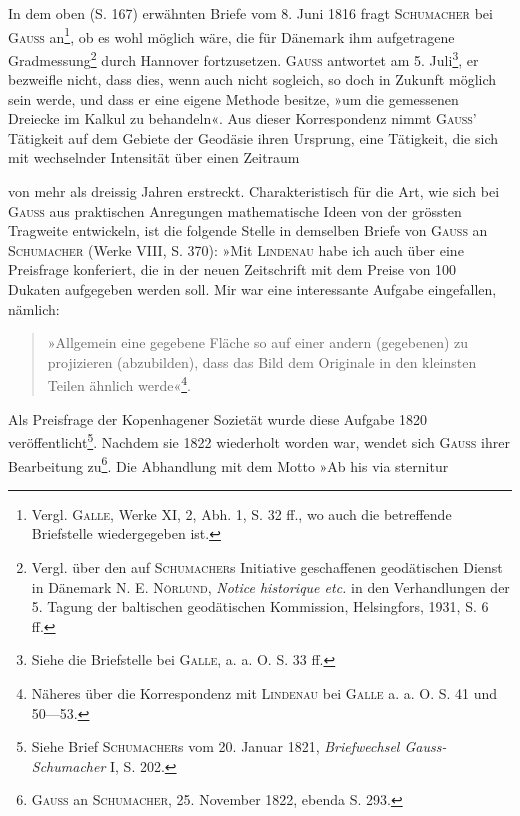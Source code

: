 \begin{center}\end{center}
\noindent\hspace*{\parindent}In dem oben (S. 167) erwähnten Briefe vom 8. Juni 1816 fragt \textsc{Schumacher}
bei \textsc{Gauss} an\footnote{Vergl. \textsc{Galle}, Werke XI, 2, Abh. 1, S. 32 ff., wo auch die betreffende Briefstelle wiedergegeben ist.}, ob es wohl möglich wäre, die für Dänemark ihm
aufgetragene Gradmessung\footnote{Vergl. über den auf \textsc{Schumacher}s Initiative geschaffenen geodätischen Dienst in Dänemark \textsc{N. E. Nörlund}, \textit{Notice historique etc.} in den Verhandlungen der 5. Tagung der baltischen geodätischen Kommission, Helsingfors, 1931, S. 6 ff.} durch Hannover fortzusetzen. \textsc{Gauss} antwortet
am 5. Juli\footnote{Siehe die Briefstelle bei \textsc{Galle}, a. a. O. S. 33 ff.}, er bezweifle nicht, dass dies, wenn auch nicht sogleich, so
doch in Zukunft möglich sein werde, und dass er eine eigene Methode besitze,
»um die gemessenen Dreiecke im Kalkul zu behandeln«. Aus dieser
Korrespondenz nimmt \textsc{Gauss}' Tätigkeit auf dem Gebiete der Geodäsie ihren
Ursprung, eine Tätigkeit, die sich mit wechselnder Intensität über einen Zeitraum
\par\clearpage{}
\noindent von mehr als dreissig Jahren erstreckt. Charakteristisch für die Art,
wie sich bei \textsc{Gauss} aus praktischen Anregungen mathematische Ideen von der
grössten Tragweite entwickeln, ist die folgende Stelle in demselben Briefe
von \textsc{Gauss} an \textsc{Schumacher} (Werke VIII, S. 370): »Mit \textsc{Lindenau} habe ich
auch über eine Preisfrage konferiert, die in der neuen Zeitschrift mit dem
Preise von 100 Dukaten aufgegeben werden soll. Mir war eine interessante
Aufgabe eingefallen, nämlich:
\begin{quote}
»Allgemein eine gegebene Fläche so auf einer andern (gegebenen) zu
projizieren (abzubilden), dass das Bild dem Originale in den kleinsten
Teilen ähnlich werde«\footnote{Näheres über die Korrespondenz mit \textsc{Lindenau} bei \textsc{Galle} a. a. O. S. 41 und 50—53.}.
\end{quote}
\noindent Als Preisfrage der Kopenhagener Sozietät wurde diese Aufgabe 1820 veröffentlicht\footnote{Siehe Brief \textsc{Schumacher}s vom 20. Januar 1821, \textit{Briefwechsel Gauss-Schumacher} I, S. 202.}.
Nachdem sie 1822 wiederholt worden war, wendet sich \textsc{Gauss}
ihrer Bearbeitung zu\footnote{\textsc{Gauss} an \textsc{Schumacher}, 25. November 1822, ebenda S. 293.}. Die Abhandlung mit dem Motto »Ab his via sternitur
